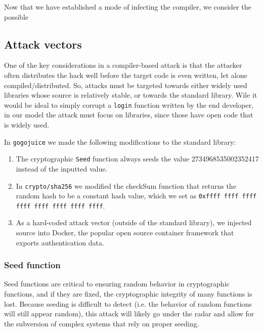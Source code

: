\documentclass[10pt]{sigplanconf}
\begin{document}
Now that we have established a mode of infecting the compiler, we consider the possible 

\subsection{Attack vectors}
One of the key considerations in a compiler-based attack is that the attacker often distributes the hack well before the target code is even written, let alone compiled/distributed. So, attacks must be targeted towards either widely used libraries whose source is relatively stable, or towards the standard library. Wile it would be ideal to simply corrupt a \texttt{login} function written by the end developer, in our model the attack must focus on libraries, since those have open code that is widely used.

\smallskip

In \texttt{gogojuice} we made the following modifications to the standard library:
\begin{enumerate}
	\item The cryptographic \texttt{Seed} function always seeds the value 2734968535002352417 instead of the inputted value. 
	\item In \texttt{crypto/sha256} we modified the checkSum function that returns the random hash to be a constant hash value, which we set as \texttt{0xffff ffff ffff ffff ffff ffff ffff ffff}.
	\item As a hard-coded attack vector (outside of the standard library), we injected source into Docker, the popular open source container framework that exports authentication data.
\end{enumerate}

\subsubsection{Seed function}
Seed functions are critical to ensuring random behavior in cryptographic functions, and if they are fixed, the cryptographic integrity of many functions is lost. Because seeding is difficult to detect (i.e. the behavior of random functions will still appear random), this attack will likely go under the radar and allow for the subversion of complex systems that rely on proper seeding.
\end{document}
